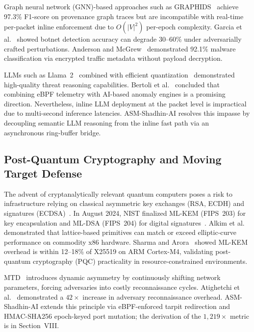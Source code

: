 \documentclass{ieeeaccess}
\renewcommand{\_}{\textunderscore\allowbreak}
\begin{document}
Graph neural network (GNN)-based approaches such as GRAPHIDS~\cite{zhao2023graphids}
achieve 97.3\% F1-score on provenance graph traces but are incompatible with
real-time per-packet inline enforcement due to $O(|V|^2)$ per-epoch complexity.
Garcia et al.~\cite{garcia2014empirical} showed botnet detection accuracy can
degrade 30--60\% under adversarially crafted perturbations. Anderson and
McGrew~\cite{anderson2016identifying} demonstrated 92.1\% malware classification
via encrypted traffic metadata without payload decryption.

LLMs such as Llama~2~\cite{touvron2023llama} combined with efficient
quantization~\cite{dettmers2023qlora} demonstrated high-quality threat reasoning
capabilities. Bertoli et al.~\cite{bertoli2023ebpf} concluded that combining eBPF
telemetry with AI-based anomaly engines is a promising direction. Nevertheless,
inline LLM deployment at the packet level is impractical due to multi-second
inference latencies. ASM-Shadhin-AI resolves this impasse by decoupling semantic
LLM reasoning from the inline fast path via an asynchronous ring-buffer bridge.

\subsection{Post-Quantum Cryptography and Moving Target Defense}
The advent of cryptanalytically relevant quantum computers poses a risk to
infrastructure relying on classical asymmetric key exchanges (RSA, ECDH) and
signatures (ECDSA)~\cite{bernstein2017post,nist2024mlkem}. In August 2024, NIST
finalized ML-KEM (FIPS~203) for key encapsulation and ML-DSA (FIPS~204) for
digital signatures~\cite{nist2024mlkem,nist2024mldsa}. Alkim et
al.~\cite{alkim2016post} demonstrated that lattice-based primitives can match or
exceed elliptic-curve performance on commodity x86 hardware. Sharma and
Arora~\cite{sharma2023evaluating} showed ML-KEM overhead is within 12--18\% of
X25519 on ARM Cortex-M4, validating post-quantum cryptography (PQC) practicality
in resource-constrained environments.

MTD~\cite{jajodia2011moving,zheng2022moving} introduces dynamic asymmetry by
continuously shifting network parameters, forcing adversaries into costly
reconnaissance cycles. Atighetchi et al.~\cite{atighetchi2003adaptive} demonstrated
a $42\times$ increase in adversary reconnaissance overhead. ASM-Shadhin-AI extends
this principle via eBPF-enforced tarpit redirection and HMAC-SHA256 epoch-keyed
port mutation; the derivation of the $1{,}219\times$ metric is in Section~VIII.
\end{document}
